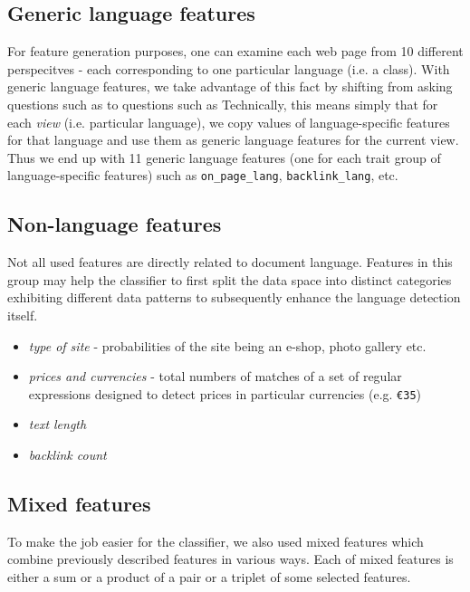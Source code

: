 \documentclass[12pt,a4paper]{article}     %
\begin{document}
  \subsection{Generic language features}
    For feature generation purposes, one can examine each web page from 10 different perspecitves -
    each corresponding to one particular language (i.e. a class). With generic language features, we
    take advantage of this fact by shifting from asking questions such as  to questions 
    such as  Technically, this means simply
    that for each \textit{view} (i.e. particular language), we copy values of language-specific
    features for that language and use them as generic language features for the current view. Thus
    we end up with 11 generic language features (one for each trait group of language-specific
    features) such as \texttt{on\_page\_lang}, \texttt{backlink\_lang}, etc.

  \subsection{Non-language features}
    Not all used features are directly related to document language. Features in this group may help the
    classifier to first split the data space into distinct categories exhibiting different data patterns 
    to subsequently enhance the language detection itself. 

    \begin{itemize}
      \item \textit{type of site} - probabilities of the site being an e-shop, photo gallery etc.
      \item \textit{prices and currencies} - total numbers of matches of a set of regular
      expressions designed to detect prices in particular currencies (e.g. \texttt{\euro 35}) 
      \item \textit{text length} 
      \item \textit{backlink count}
    \end{itemize}
    
  \subsection{Mixed features}

    To make the job easier for the classifier, we also used mixed features which combine previously
    described features in various ways. Each of mixed features is either a sum or a product of a
    pair or a triplet of some selected features.
\end{document}
